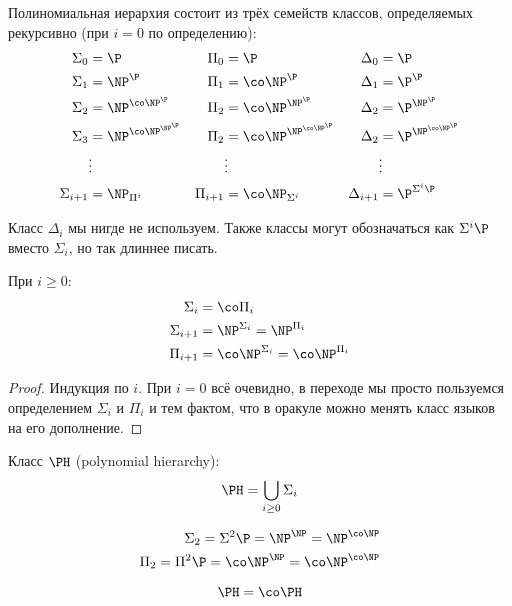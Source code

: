	\begin{Def}
		Полиномиальная иерархия состоит из трёх семейств классов, определяемых рекурсивно (при $i=0$ по определению):
		\begin{align*}
			\Sigma_0 &= \P & \Pi_0 &= \P & \Delta_0 &= \P \\
			\Sigma_1 &= \NP^{\P} & \Pi_1 &= \co\NP^{\P} & \Delta_1 &= \P^{\P} \\
			\Sigma_2 &= \NP^{\co\NP^{\P}} & \Pi_2 &= \co\NP^{\NP^{\P}} & \Delta_2 &= \P^{\NP^\P} \\
			\Sigma_3 &= \NP^{\co\NP^{\NP^{\P}}} & \Pi_2 &= \co\NP^{\NP^{\co\NP^{\P}}} & \Delta_2 &= \P^{\NP^{\co\NP^\P}} \\
			&\vdots && \vdots && \vdots \\
			\Sigma_{i+1} &= \NP_{\Pi^i} & \Pi_{i+1} &= \co\NP_{\Sigma^i} & \Delta_{i+1} &= \P^{\Sigma^i\P}
		\end{align*}
	\end{Def}
	\begin{Rem}
		Класс $\Delta_i$ мы нигде не используем.
		Также классы могут обозначаться как $\Sigma^i \P$ вместо $\Sigma_i$, но так длиннее писать.
	\end{Rem}
	\begin{assertion}
		При $i \ge 0$:
		\begin{align*}
			\Sigma_i &= \co\Pi_i \\
			\Sigma_{i+1} &= \NP^{\Sigma_i} = \NP^{\Pi_i} \\
			\Pi_{i+1} &= \co\NP^{\Sigma_i} = \co\NP^{\Pi_i} \\
		\end{align*}
	\end{assertion}
	\begin{proof}
		Индукция по $i$.
		При $i=0$ всё очевидно, в переходе мы просто пользуемся определением $\Sigma_i$ и $\Pi_i$ и тем фактом, что в оракуле можно менять класс языков на его дополнение.
	\end{proof}
	\begin{Def}
		Класс $\PH$ (polynomial hierarchy):
		\[ \PH = \bigcup_{i \ge 0} \Sigma_i \]
	\end{Def}
	\begin{exmp}
		\begin{align*}
			\Sigma_2 = \Sigma^2 \P = \NP^{\NP} = \NP^{\co\NP} \\
			\Pi_2 = \Pi^2 \P = \co\NP^{\NP} = \co\NP^{\co\NP}
		\end{align*}
	\end{exmp}
	\begin{assertion}
		\[ \PH = \co\PH \]
	\end{assertion}
